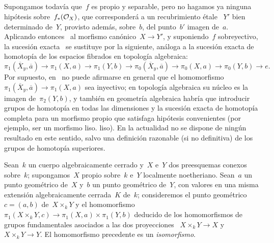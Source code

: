 \setcounter{subsection}{5}%
\subsection{}
{\label{X.I.6}}
{\label{X.1.6}}
\setcounter{proposition}{6}%
Supongamos todavía que~$f$ es propio y separable, pero no hagamos ya ninguna
hipótesis sobre~$f_*(\cal{O}_X)$, que corresponderá a un recubrimiento étale
~$Y'$ bien determinado de~$Y$, provisto además, sobre~$b$, del punto~$b'$
imagen de~$a$. Aplicando entonces~ al morfismo canónico~$X\to Y'$,
y suponiendo~$f$ sobreyectivo, la sucesión exacta~ se sustituye por
la siguiente, análoga a la sucesión exacta de homotopía de los espacios
fibrados en topología algebraica:
$$
\pi_1(\overline X_y,\overline a)\to \pi_1(X,a)\to \pi_1(Y,b)\to
\pi_0(\overline X_y,\overline a)\to \pi_0(X,a)\to \pi_0(Y,b)\to e.
$$
Por supuesto, en~ no puede afirmarse en general que el
homomorfismo~$\pi_1(\overline X_y,\overline a)\to \pi_1(X,a)$ sea inyectivo;
en topología algebraica su núcleo es la imagen de~$\pi_2(Y,b)$, y también en
geometría algebraica habría que introducir grupos de homotopía en todas las
dimensiones y la sucesión exacta de homotopía completa para un morfismo propio
que satisfaga hipótesis convenientes (por ejemplo, ser un morfismo
{liso.}
{liso).}
En la actualidad no se dispone de ningún resultado en este sentido, salvo una
definición razonable (si no definitiva) de los grupos de homotopía superiores.

\begin{corollaire}
\label{X.1.7}
Sean~$k$ un cuerpo algebraicamente cerrado y~$X$ e~$Y$ dos preesquemas conexos
sobre~$k$; supongamos~$X$ propio sobre~$k$ e~$Y$ localmente
noetheriano. Sean~$a$ un punto geométrico de~$X$ y~$b$ un punto geométrico
de~$Y$, con valores en una misma extensión algebraicamente cerrada~$K$ de~$k$;
consideremos el punto geométrico~$c=(a,b)$ de~$X\times_k Y$ y el homomorfismo
~$\pi_1(X\times_k Y,c)\to \pi_1(X,a)\times\pi_1(Y,b)$ deducido de los
homomorfismos de grupos fundamentales asociados a las dos proyecciones
~$X\times_k Y\to X$ y~$X\times_k Y\to Y$. El homomorfismo precedente es un
\emph{isomorfismo}.
\end{corollaire}

